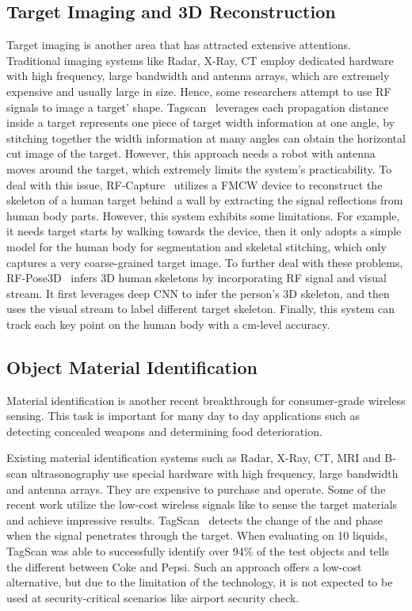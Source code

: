 \subsection{Target Imaging and 3D Reconstruction}

Target imaging is another area that has attracted extensive attentions. Traditional imaging systems like Radar, X-Ray, CT employ dedicated
hardware with high frequency, large bandwidth and antenna arrays, which are extremely expensive and usually large in size. Hence, some
researchers attempt to use RF signals to image a target' shape. Tagscan~\cite{Tagscan} leverages each propagation distance inside a target
represents one piece of target width information at one angle, by stitching together the width information at many angles can obtain the
horizontal cut image of the target. However, this approach needs a robot with antenna moves around the target, which extremely limits the
system's practicability. To deal with this issue, RF-Capture~\cite{Adib2017Capturing} utilizes a FMCW device to reconstruct the skeleton of
a human target behind a wall by extracting the signal reflections from human body parts. However, this system exhibits some limitations.
For example, it needs target starts by walking towards the device, then it only adopts a simple model for the human body for segmentation
and skeletal stitching, which only captures a very coarse-grained target image. To further deal with these problems,
RF-Pose3D~\cite{zhao2018rf} infers 3D human skeletons by incorporating RF signal and visual stream. It first leverages deep CNN to infer
the person's 3D skeleton, and then uses the visual stream to label different target skeleton. Finally, this system can track each key point
on the human body with a cm-level accuracy.


\subsection{Object Material Identification}
Material identification is another recent breakthrough for consumer-grade wireless sensing. This task is important for many day to day
applications such as detecting concealed weapons and determining food deterioration.

Existing material identification systems such as Radar, X-Ray, CT, MRI and B-scan ultrasonography use special hardware with high frequency,
large bandwidth and antenna arrays. They are expensive to purchase and operate. Some of the recent work utilize the low-cost wireless
signals like \RF to sense the target materials and achieve impressive results. TagScan~\cite{Tagscan} detects the change of the \RSSI and
phase when the \RF signal penetrates through the target. When evaluating on 10 liquids, TagScan was able to successfully identify over 94\%
of the test objects and tells the different between Coke and Pepsi. Such an approach offers a low-cost alternative, but due to the
limitation of the technology, it is not expected to be used at security-critical scenarios like airport security check.


